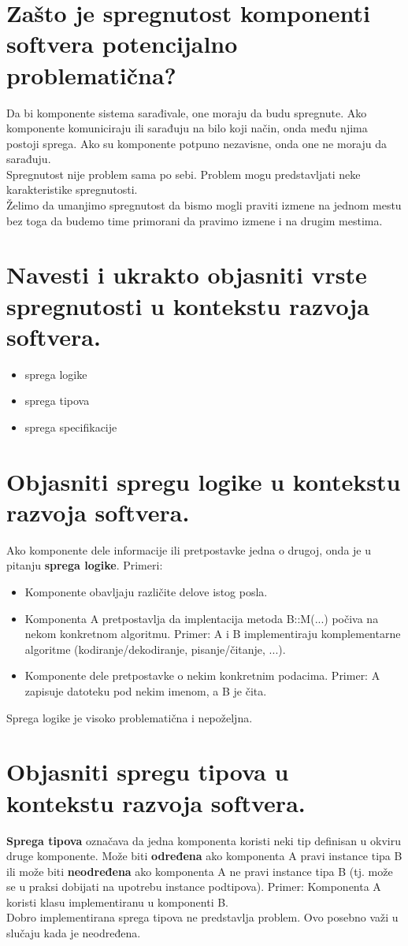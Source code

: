 \documentclass[a4paper]{article}
\begin{document}
\section{Zašto je spregnutost komponenti softvera potencijalno problematična?}
  Da bi komponente sistema sarađivale, one moraju da budu spregnute. Ako komponente 
  komuniciraju ili sarađuju na bilo koji način, onda među njima postoji sprega. Ako
  su komponente potpuno nezavisne, onda one ne moraju da sarađuju. \\
  \indent Spregnutost nije problem sama po sebi. Problem mogu predstavljati neke karakteristike
  spregnutosti. \\
  \indent Želimo da umanjimo spregnutost da bismo mogli praviti izmene na jednom mestu bez toga
  da budemo time primorani da pravimo izmene i na drugim mestima. 

\section{Navesti i ukrakto objasniti vrste spregnutosti u kontekstu razvoja softvera.}
  \begin{itemize}
    \item sprega logike
    \item sprega tipova
    \item sprega specifikacije
  \end{itemize}

\section{Objasniti spregu logike u kontekstu razvoja softvera.}
  Ako komponente dele informacije ili pretpostavke jedna o drugoj, onda je u pitanju
  \textbf{sprega logike}. Primeri:
  \begin{itemize}
    \item Komponente obavljaju različite delove istog posla.
    \item Komponenta A pretpostavlja da implentacija metoda B::M(...) počiva na nekom
          konkretnom algoritmu. Primer: A i B implementiraju komplementarne algoritme
          (kodiranje/dekodiranje, pisanje/čitanje, ...).
    \item Komponente dele pretpostavke o nekim konkretnim podacima. Primer: 
          A zapisuje datoteku pod nekim imenom, a B je čita.
  \end{itemize}
  Sprega logike je visoko problematična i nepoželjna.

\section{Objasniti spregu tipova u kontekstu razvoja softvera.}
  \textbf{Sprega tipova} označava da jedna komponenta koristi neki tip definisan u okviru druge
  komponente. Može biti \textbf{određena} ako komponenta A pravi instance tipa B ili
  može biti \textbf{neodređena} ako komponenta A ne pravi instance tipa B (tj. može se u praksi
  dobijati na upotrebu instance podtipova). Primer: Komponenta A koristi klasu implementiranu
  u komponenti B. \\
  \indent Dobro implementirana sprega tipova ne predstavlja problem. Ovo posebno važi u slučaju
  kada je neodređena.
\end{document}
